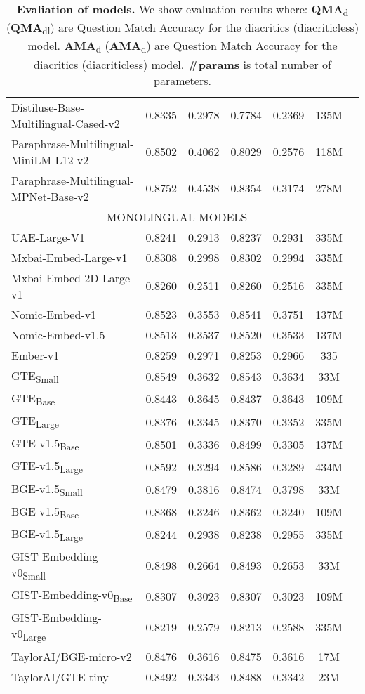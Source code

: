 \begin{table}[ht!]
\begin{tabular}{lcccccc}
    Distiluse-Base-Multilingual-Cased-v2 & 0.8335 & 0.2978 & 0.7784 & 0.2369 & 135M \\
    Paraphrase-Multilingual-MiniLM-L12-v2 & 0.8502 & 0.4062 & 0.8029 & 0.2576 & 118M \\
    Paraphrase-Multilingual-MPNet-Base-v2 & 0.8752 & 0.4538 & 0.8354 & 0.3174 & 278M \\
    \hline
    \multicolumn{6}{c}{MONOLINGUAL MODELS} \\
    \hline
    UAE-Large-V1 & 0.8241 & 0.2913 & 0.8237 & 0.2931 & 335M \\
    Mxbai-Embed-Large-v1 & 0.8308 & 0.2998 & 0.8302 & 0.2994 & 335M \\
    Mxbai-Embed-2D-Large-v1 & 0.8260 & 0.2511 & 0.8260 & 0.2516 & 335M \\
    Nomic-Embed-v1 & 0.8523 & 0.3553 & 0.8541 & 0.3751 & 137M \\
    Nomic-Embed-v1.5 & 0.8513 & 0.3537 & 0.8520 & 0.3533 & 137M \\
    Ember-v1 & 0.8259 & 0.2971 & 0.8253 & 0.2966 & 335 \\
    GTE\textsubscript{Small} & 0.8549 & 0.3632 & 0.8543 & 0.3634 & 33M \\
    GTE\textsubscript{Base} & 0.8443 & 0.3645 & 0.8437 & 0.3643 & 109M \\
    GTE\textsubscript{Large} & 0.8376 & 0.3345 & 0.8370 & 0.3352 & 335M \\
    GTE-v1.5\textsubscript{Base} & 0.8501 & 0.3336 & 0.8499 & 0.3305 & 137M \\
    GTE-v1.5\textsubscript{Large} & 0.8592 & 0.3294 & 0.8586 & 0.3289 & 434M \\
    BGE-v1.5\textsubscript{Small} & 0.8479 & 0.3816 & 0.8474 & 0.3798 & 33M \\
    BGE-v1.5\textsubscript{Base} & 0.8368 & 0.3246 & 0.8362 & 0.3240 & 109M \\
    BGE-v1.5\textsubscript{Large} & 0.8244 & 0.2938 & 0.8238 & 0.2955 & 335M \\
    GIST-Embedding-v0\textsubscript{Small} & 0.8498 & 0.2664 & 0.8493 & 0.2653 & 33M \\
    GIST-Embedding-v0\textsubscript{Base} & 0.8307 & 0.3023 & 0.8307 & 0.3023 & 109M \\
    GIST-Embedding-v0\textsubscript{Large} & 0.8219 & 0.2579 & 0.8213 & 0.2588 & 335M \\
    TaylorAI/BGE-micro-v2 & 0.8476 & 0.3616 & 0.8475 & 0.3616 & 17M \\
    TaylorAI/GTE-tiny & 0.8492 & 0.3343 & 0.8488 & 0.3342 & 23M \\
    \bottomrule
  \end{tabular}
  \caption{\textbf{Evaliation of models.}
    We show evaluation results where:
    \textbf{QMA}\textsubscript{d} (\textbf{QMA}\textsubscript{dl}) are Question Match Accuracy for the diacritics (diacriticless) model.
    \textbf{AMA}\textsubscript{d} (\textbf{AMA}\textsubscript{d}) are Question Match Accuracy for the diacritics (diacriticless) model.
    \textbf{\#params} is total number of parameters.}
  \label{tab:evaluatinon}
\end{table}
  